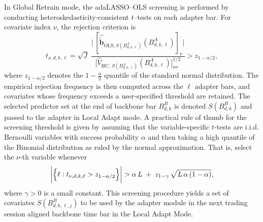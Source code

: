 \documentclass[10pt,a4paper,oneside]{article}
\DeclarePairedDelimiter{\aval}{\lvert}{\rvert} %
\begin{document}
In Global Retrain mode, the adaLASSO–OLS screening is performed by conducting heteroskedasticity‐consistent \(t\)–tests on each adapter bar.  For covariate index \(\nu\), the rejection criterion is
\[
    t_{\nu,d,k,\ell} = \sqrt{J}\;
    \frac{\bigl|\,[\hat{\tilde{\mathbf b}}_{\mathrm{OLS},S(B^A_{d,k,\ell})}(B^A_{d,k,\ell})]_{\nu}\bigr|}
    {\bigl[\hat V_{\mathrm{HC},\,S(B^A_{d,k,\ell})}(B^A_{d,k,\ell})\bigr]_{\nu\nu}^{1/2}}
    > z_{1-\alpha/2},
\]
where \(z_{1-\alpha/2}\) denotes the \(1-\tfrac\alpha2\) quantile of the standard normal distribution.  The empirical rejection frequency is then computed across the \(\ell\) adapter bars, and covariates whose frequency exceeds a user‐specified threshold are retained.  The selected predictor set at the end of backbone bar \(B^B_{d,k}\) is denoted \(S(B^B_{d,k})\) and passed to the adapter in Local Adapt mode.  A practical rule of thumb for the screening threshold is  given by assuming that the variable-specific \(t\)-tests are i.i.d. Bernoulli variables with success probability $\alpha$ and then taking a high quantile of the Binomial distribution as ruled by the normal approximation. That is, select the $\nu$-th variable whenever
\[
    \aval*{ \left\{\ell : t_{\nu,d,k,\ell} > z_{1 - \alpha/2}\right\}} > \alpha\,L \;+\; z_{1-\gamma}\,\sqrt{L\,\alpha\,(1-\alpha)},
\]
where \(\gamma>0\) is a small constant. This screening procedure yields a set of covariates $S\left( B^B_{d,k,\ell,j} \right)$ to be used by the adapter module in the next trading session aligned backbone time bar in the Local Adapt Mode.


\end{document}

